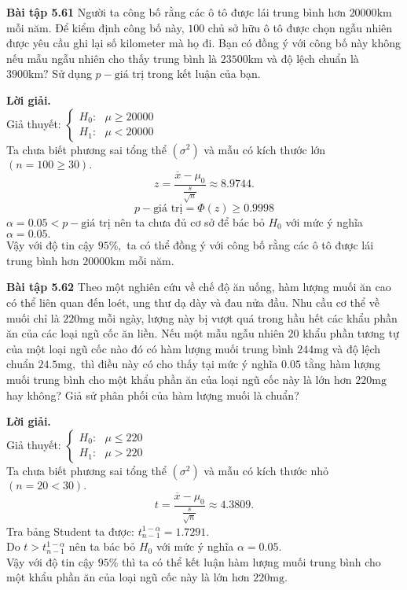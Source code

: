 \begin{mybox}
\textbf{Bài tập 5.61} Người ta công bố rằng các ô tô được lái trung bình hơn $20000 \mathrm{km}$ mỗi năm. Để kiểm định công bố này, $100$ chủ sở hữu ô tô được chọn ngẫu nhiên được yêu cầu ghi lại số kilometer mà họ đi. Bạn có đồng ý với công bố này không nếu mẫu ngẫu nhiên cho thấy trung bình là $23500 \mathrm{km}$ và độ lệch chuẩn là $3900 \mathrm{km}?$ Sử dụng $p-\text{giá trị}$ trong kết luận của bạn.
\end{mybox}
\textbf{Lời giải.}\\
Giả thuyết: $\begin{cases}
H_0: \text{ } \mu \geqslant 20000\\
H_1: \text{ } \mu < 20000
\end{cases} $ \\
Ta chưa biết phương sai tổng thể $\left( {\sigma^2} \right)$ và mẫu có kích thước lớn $\left( {n = 100 \geqslant 30} \right).$
$$z = \frac{\overline{x} - \mu_0}{\frac{s}{\sqrt{n}}} \approx 8.9744.$$
$$p-\text{giá trị} = \Phi \left( z \right) \geqslant 0.9998$$
$\alpha = 0.05 < p-\text{giá trị}$ nên ta chưa đủ cơ sở để bác bỏ $H_0$ với mức ý nghĩa $\alpha = 0.05.$\\
Vậy với độ tin cậy $95\%,$ ta có thể đồng ý với công bố rằng các ô tô được lái trung bình hơn $20000 \mathrm{km}$ mỗi năm.

\begin{mybox}
\textbf{Bài tập 5.62} Theo một nghiên cứu về chế độ ăn uống, hàm lượng muối ăn cao có thể liên quan đến loét, ung thư dạ dày và đau nửa đầu. Nhu cầu cơ thể về muối chỉ là $220 \mathrm{mg}$ mỗi ngày, lượng này bị vượt quá trong hầu hết các khẩu phần ăn của các loại ngũ cốc ăn liền. Nếu một mẫu ngẫu nhiên $20$ khẩu phần tương tự của một loại ngũ cốc nào đó có hàm lượng muối trung bình $244 \mathrm{mg}$ và độ lệch chuẩn $24.5 \mathrm{mg},$ thì điều này có cho thấy tại mức ý nghĩa $0.05$ tằng hàm lượng muối trung bình cho một khẩu phần ăn của loại ngũ cốc này là lớn hơn $220 \mathrm{mg}$ hay không? Giả sử phân phối của hàm lượng muối là chuẩn?
\end{mybox}
\textbf{Lời giải.}\\
Giả thuyết: $\begin{cases}
H_0: \text{ } \mu \leqslant 220\\
H_1: \text{ } \mu > 220
\end{cases} $ \\
Ta chưa biết phương sai tổng thể $\left( {\sigma^2} \right)$ và mẫu có kích thước nhỏ $\left( {n = 20 < 30} \right).$
$$t = \frac{\overline{x} - \mu_0}{\frac{s}{\sqrt{n}}} \approx 4.3809.$$
Tra bảng Student ta được: $t_{n - 1}^{1 - \alpha}  = 1.7291.$\\
Do $t > t_{n - 1}^{1 - \alpha}$ nên ta bác bỏ $H_0$ với mức ý nghĩa $\alpha = 0.05.$\\
Vậy với độ tin cậy $95\%$ thì ta có thể kết luận hàm lượng muối trung bình cho một khẩu phần ăn của loại ngũ cốc này là lớn hơn $220 \mathrm{mg}.$